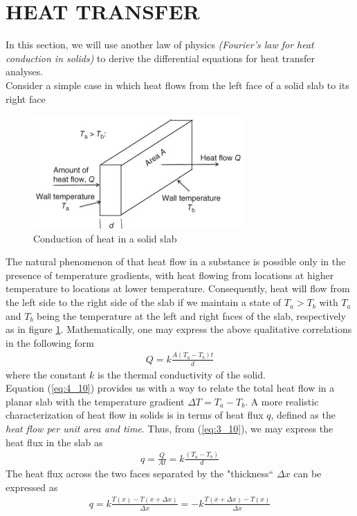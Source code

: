 \documentclass[11pt]{report}
\newcommand{\sps}{\\[0.2cm]}
\newcommand{\refn}[1]{(\ref{#1})}
\newcommand{\refx}[1]{\refn{eq:#1}}
\begin{document}
	\section{HEAT TRANSFER}
	In this section, we will use another law of physics \textit{(Fourier's law for heat conduction in solids)} to derive the differential equations for heat transfer analyses.\sps
	Consider a simple case in which heat flows from the left face of a solid slab to its right face
	\begin{figure}[h!]
		\centering
		\includegraphics[width=0.68\linewidth]{slab}
		\caption{Conduction of heat in a solid slab}
		\label{fig:4_1}
	\end{figure}
	The natural phenomenon of that heat flow in a substance is possible only in the presence of temperature
	gradients, with heat flowing from locations at higher temperature to locations at lower temperature.
	Consequently, heat will flow from the left side to the right side of the slab if we maintain a state of $T_a > T_b$ with $T_a$ and $T_b$ being the temperature at the left and right faces of the slab, respectively as in figure \ref{fig:4_1}. Mathematically, one may express the above qualitative correlations in the following form
	\begin{eqnarray}
		Q = k \frac{A(T_a - T_b)t}{d}\label{eq:4_10}
	\end{eqnarray}
	where the constant $k$ is the thermal conductivity of the solid.\sps
	Equation \refx{4_10} provides us with a way to relate the total heat flow in a planar slab with the temperature gradient $\Delta T = T_a - T_b$. A more realistic characterization of heat flow in solids is in terms of heat flux $q$, defined as the \textit{heat flow per unit area and time}. Thus, from \refx{3_10}, we may express the heat flux in the slab as
	\begin{eqnarray}
		q = \frac{Q}{At} = k\frac{(T_a - T_b)}{d}\label{eq:4_11}
	\end{eqnarray}
	The heat flux across the two faces separated by the "thickness`` $\Delta x $ can be expressed as
	\begin{eqnarray}
		q = k\frac{T(x) - T(x + \Delta x)}{\Delta x} = -k\frac{T(x+\Delta x) - T(x)}{\Delta x}\label{eq:4_12}
	\end{eqnarray}
\end{document}
